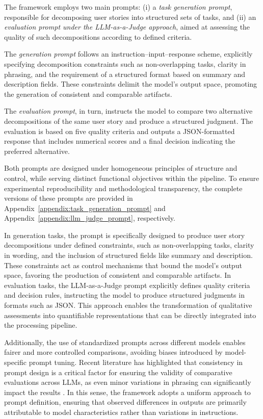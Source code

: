 \documentclass[pdflatex,sn-mathphys-num]{sn-jnl}%
\theoremstyle{thmstyleone}%
\theoremstyle{thmstyletwo}%
\theoremstyle{thmstylethree}%
\begin{document}
The framework employs two main prompts: (i) a \textit{task generation prompt}, responsible for decomposing user stories into structured sets of tasks, and (ii) an \textit{evaluation prompt under the LLM-as-a-Judge approach}, aimed at assessing the quality of such decompositions according to defined criteria.

The \textit{generation prompt} follows an instruction–input–response scheme, explicitly specifying decomposition constraints such as non-overlapping tasks, clarity in phrasing, and the requirement of a structured format based on summary and description fields. These constraints delimit the model’s output space, promoting the generation of consistent and comparable artifacts.

The \textit{evaluation prompt}, in turn, instructs the model to compare two alternative decompositions of the same user story and produce a structured judgment. The evaluation is based on five quality criteria and outputs a JSON-formatted response that includes numerical scores and a final decision indicating the preferred alternative.

Both prompts are designed under homogeneous principles of structure and control, while serving distinct functional objectives within the pipeline. To ensure experimental reproducibility and methodological transparency, the complete versions of these prompts are provided in Appendix~\ref{appendix:task_generation_prompt} and Appendix~\ref{appendix:llm_judge_prompt}, respectively.

In generation tasks, the prompt is specifically designed to produce user story decompositions under defined constraints, such as non-overlapping tasks, clarity in wording, and the inclusion of structured fields like summary and description. These constraints act as control mechanisms that bound the model’s output space, favoring the production of consistent and comparable artifacts. In evaluation tasks, the LLM-as-a-Judge prompt explicitly defines quality criteria and decision rules, instructing the model to produce structured judgments in formats such as JSON. This approach enables the transformation of qualitative assessments into quantifiable representations that can be directly integrated into the processing pipeline.

Additionally, the use of standardized prompts across different models enables fairer and more controlled comparisons, avoiding biases introduced by model-specific prompt tuning. Recent literature has highlighted that consistency in prompt design is a critical factor for ensuring the validity of comparative evaluations across LLMs, as even minor variations in phrasing can significantly impact the results \cite{structured_prompting}. In this sense, the framework adopts a uniform approach to prompt definition, ensuring that observed differences in outputs are primarily attributable to model characteristics rather than variations in instructions.
\end{document}

